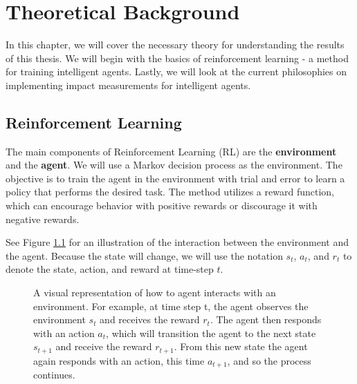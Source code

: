 \documentclass[12pt,A4]{report}
\theoremstyle{definition}
\begin{document}
\chapter{Theoretical Background}
In this chapter, we will cover the necessary theory for understanding the results of this thesis. We will begin with the basics of reinforcement learning - a method for training intelligent agents. Lastly, we will look at the current philosophies on implementing impact measurements for intelligent agents. 

\section{Reinforcement Learning}
The main components of Reinforcement Learning (RL) are the \textbf{environment} and the \textbf{agent}. We will use a Markov decision process as the environment. The objective is to train the agent in the environment with trial and error to learn a policy that performs the desired task. The method utilizes a reward function, which can encourage behavior with positive rewards or discourage it with negative rewards. 

See Figure \ref{fig:RL} for an illustration of the interaction between the environment and the agent. Because the state will change, we will use the notation $s_t$, $a_t$, and $r_t$ to denote the state, action, and reward at time-step $t$.


\begin{figure}[H]
  
  \caption{A visual representation of how to agent interacts with an environment. For example, at time step t, the agent observes the environment $s_t$ and receives the reward $r_t$. The agent then responds with an action $a_t$, which will transition the agent to the next state $s_{t+1}$ and receive the reward $r_{t+1}$. From this new state the agent again responds with an action, this time $a_{t+1}$, and so the process continues. } 
  \label{fig:RL}
\end{figure} 
 
\end{document}
